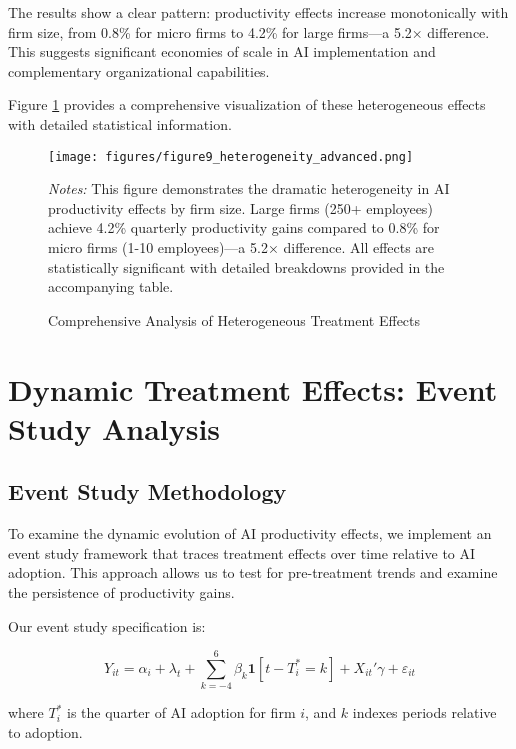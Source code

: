 \documentclass[12pt, a4paper]{article}
\begin{document}
The results show a clear pattern: productivity effects increase monotonically with firm size, from 0.8\% for micro firms to 4.2\% for large firms—a 5.2× difference. This suggests significant economies of scale in AI implementation and complementary organizational capabilities.

Figure \ref{fig:heterogeneity_advanced} provides a comprehensive visualization of these heterogeneous effects with detailed statistical information.

\begin{figure}[H]
\centering
\texttt{[image: figures/figure9\_heterogeneity\_advanced.png]}
\caption{Comprehensive Analysis of Heterogeneous Treatment Effects}
\label{fig:heterogeneity_advanced}
\begin{minipage}{\textwidth}
\footnotesize
\textit{Notes:} This figure demonstrates the dramatic heterogeneity in AI productivity effects by firm size. Large firms (250+ employees) achieve 4.2\% quarterly productivity gains compared to 0.8\% for micro firms (1-10 employees)—a 5.2× difference. All effects are statistically significant with detailed breakdowns provided in the accompanying table.
\end{minipage}
\end{figure}

\section{Dynamic Treatment Effects: Event Study Analysis}

\subsection{Event Study Methodology}

To examine the dynamic evolution of AI productivity effects, we implement an event study framework that traces treatment effects over time relative to AI adoption. This approach allows us to test for pre-treatment trends and examine the persistence of productivity gains.

Our event study specification is:

\begin{equation}
Y_{it} = \alpha_i + \lambda_t + \sum_{k=-4}^{6} \beta_k \mathbf{1}[t - T_i^* = k] + X_{it}'\gamma + \varepsilon_{it}
\end{equation}

where $T_i^*$ is the quarter of AI adoption for firm $i$, and $k$ indexes periods relative to adoption.
\end{document}
